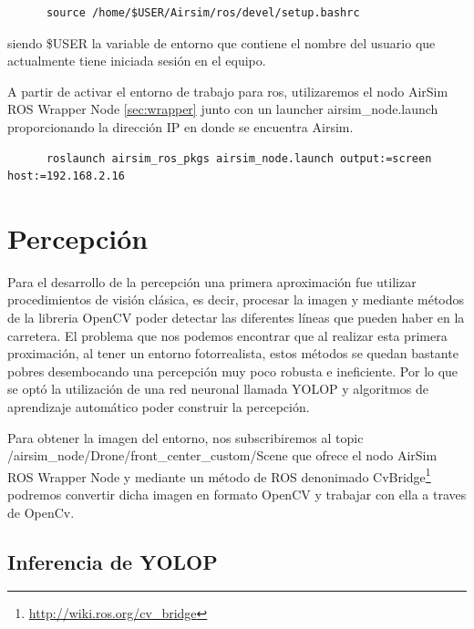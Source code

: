 \begin{enumerate}
    \begin{lstlisting}
      source /home/$USER/Airsim/ros/devel/setup.bashrc
    \end{lstlisting}
     siendo \$USER la variable de entorno que contiene el nombre del usuario que actualmente tiene iniciada sesión en el equipo.

     A partir de activar el entorno de trabajo para ros, utilizaremos el nodo AirSim ROS Wrapper Node \ref{sec:wrapper} junto con un launcher airsim\_node.launch proporcionando
     la dirección IP en donde se encuentra Airsim.\newline

     \begin{lstlisting}
      roslaunch airsim_ros_pkgs airsim_node.launch output:=screen host:=192.168.2.16
    \end{lstlisting}

  \end{enumerate}

\section{Percepción}
\label{sec:Percepción}
Para el desarrollo de la percepción una primera aproximación fue utilizar
procedimientos de visión clásica, es decir, procesar la imagen y mediante métodos de la libreria OpenCV
poder detectar las diferentes líneas que pueden haber en la carretera. El problema que nos podemos encontrar que al realizar esta primera proximación, al tener un 
entorno fotorrealista, estos métodos se quedan bastante pobres desembocando una percepción muy poco robusta e ineficiente. Por lo que se optó la utilización
de una red neuronal llamada YOLOP y algoritmos de aprendizaje automático poder construir la percepción. \newline

Para obtener la imagen del entorno, nos subscribiremos al topic /airsim\_node/Drone/front\_center\_custom/Scene que ofrece el nodo AirSim ROS Wrapper Node
 y mediante un método de ROS denonimado CvBridge\footnote{\url{http://wiki.ros.org/cv_bridge}} podremos convertir dicha imagen en formato OpenCV y trabajar con ella a traves de OpenCv.\newline

\subsection{Inferencia de YOLOP}
\label{sec:Inferencia de YOLOP}

